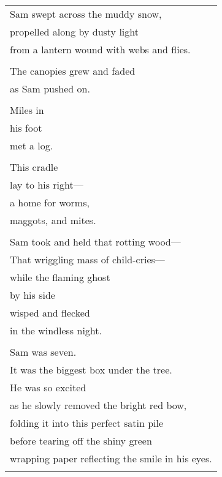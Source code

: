 \documentclass{article}
\begin{document}
\begin{center}
\begin{tabular}{l}
Sam swept across the muddy snow, \\
propelled along by dusty light \\
from a lantern wound with webs and flies. \\
\\
The canopies grew and faded \\
as Sam pushed on. \\
\\
Miles in \\
his foot \\
met a log. \\
\\
This cradle \\
lay to his right--- \\
a home for worms, \\
maggots, and mites. \\
\\
Sam took and held that rotting wood--- \\
That wriggling mass of child-cries--- \\
while the flaming ghost \\
by his side \\
wisped and flecked \\
in the windless night. \\
\\
\hspace*{2ex}Sam was seven. \\
\hspace*{2ex}It was the biggest box under the tree. \\
\hspace*{2ex}He was so excited \\
\hspace*{2ex}as he slowly removed the bright red bow, \\
\hspace*{2ex}folding it into this perfect satin pile \\
\hspace*{2ex}before tearing off the shiny green \\
\hspace*{2ex}wrapping paper reflecting the smile in his eyes. \\
\\

\end{tabular}
\end{center}
\end{document}
